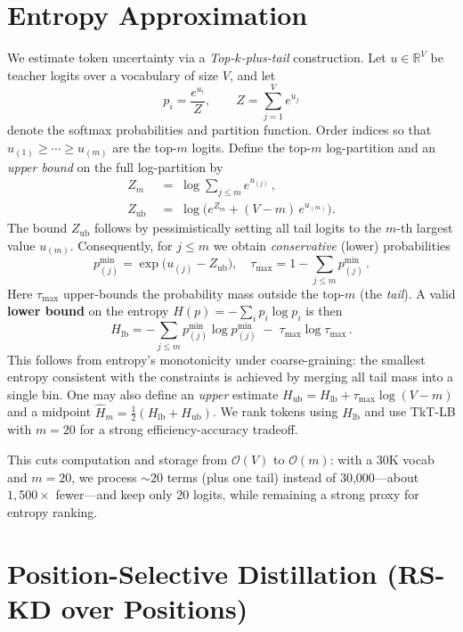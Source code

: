 \documentclass[11pt]{article}
\begin{document}
\section{Entropy Approximation}
\label{sec:entropy}
We estimate token uncertainty via a \emph{Top-$k$-plus-tail} construction. Let $u \in \mathbb{R}^V$ be teacher logits over a vocabulary of size $V$, and let
$$
p_i = \frac{e^{u_i}}{Z},\qquad Z = \sum_{j=1}^{V} e^{u_j}
$$
denote the softmax probabilities and partition function. Order indices so that $u_{(1)} \geq \cdots \geq u_{(m)}$ are the top-$m$ logits. Define the top-$m$ log-partition and an \emph{upper bound} on the full log-partition by
\begin{align}
Z_m \;&=\; \log \sum_{j \leq m} e^{u_{(j)}}\,,\\
Z_{\text{ub}} \;&=\; \log\Big(e^{Z_m} + (V-m)\,e^{u_{(m)}}\Big).
\end{align}
The bound $Z_{\text{ub}}$ follows by pessimistically setting all tail logits to the $m$-th largest value $u_{(m)}$. Consequently, for $j \leq m$ we obtain \emph{conservative} (lower) probabilities
$$
p^{\min}_{(j)} = \exp\big(u_{(j)} - Z_{\text{ub}}\big),\quad
  \tau_{\max} = 1 - \sum_{j \leq m} p^{\min}_{(j)}\,.
$$
Here $\tau_{\max}$ upper-bounds the probability mass outside the top-$m$ (the \emph{tail}). A valid \textbf{lower bound} on the entropy $H(p) = -\sum_i p_i \log p_i$ is then
\[
H_{\text{lb}} = -\sum_{j \leq m} p^{\min}_{(j)} \log p^{\min}_{(j)} \; - \; \tau_{\max} \log \tau_{\max}\,.
\]
This follows from entropy's monotonicity under coarse-graining: the smallest entropy consistent with the constraints is achieved by merging all tail mass into a single bin.
One may also define an \emph{upper} estimate $H_{\text{ub}} = H_{\text{lb}} + \tau_{\max}\log(V-m)$ and a midpoint $\widehat{H}_m = \tfrac{1}{2}(H_{\text{lb}}+H_{\text{ub}})$. We rank tokens using $H_{\text{lb}}$ and use TkT-LB with $m{=}20$ for a strong efficiency-accuracy tradeoff.

This cuts computation and storage from $\mathcal{O}(V)$ to $\mathcal{O}(m)$: with a 30K vocab and $m{=}20$, we process $\sim20$ terms (plus one tail) instead of 30{,}000—about $1{,}500\times$ fewer—and keep only 20 logits, while remaining a strong proxy for entropy ranking.

\section{Position-Selective Distillation (RS-KD over Positions)}
\label{sec:posrs}
\end{document}
